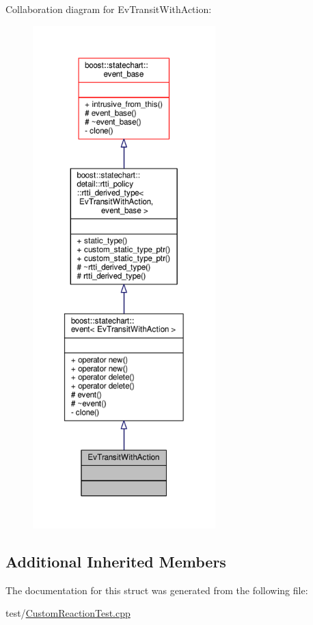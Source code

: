 Collaboration diagram for Ev\+Transit\+With\+Action\+:
\nopagebreak
\begin{figure}[H]
\begin{center}
\leavevmode
\includegraphics[height=550pt]{struct_ev_transit_with_action__coll__graph}
\end{center}
\end{figure}
\subsection*{Additional Inherited Members}


The documentation for this struct was generated from the following file\+:\begin{DoxyCompactItemize}
\item 
test/\mbox{\hyperlink{_custom_reaction_test_8cpp}{Custom\+Reaction\+Test.\+cpp}}\end{DoxyCompactItemize}
